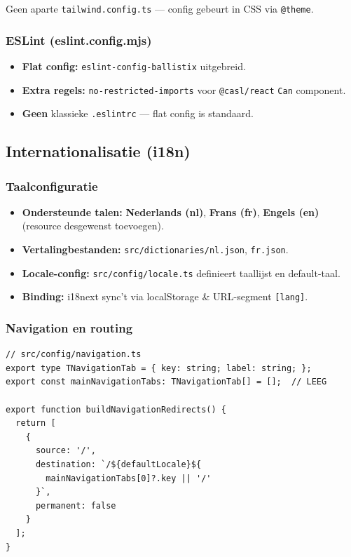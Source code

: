 \noindent
Geen aparte \texttt{tailwind.config.ts} — config gebeurt in CSS via \texttt{@theme}.

\subsubsection{ESLint (eslint.config.mjs)}

\begin{itemize}
  \item \textbf{Flat config:} \texttt{eslint-config-ballistix} uitgebreid.
  \item \textbf{Extra regels:} \texttt{no-restricted-imports} voor \texttt{@casl/react} \texttt{Can} component.
  \item \textbf{Geen} klassieke \texttt{.eslintrc} — flat config is standaard.
\end{itemize}

\subsection{Internationalisatie (i18n)}

\subsubsection{Taalconfiguratie}

\begin{itemize}
  \item \textbf{Ondersteunde talen:} \textbf{Nederlands (nl)}, \textbf{Frans (fr)}, \textbf{Engels (en)} (resource desgewenst toevoegen).
  \item \textbf{Vertalingbestanden:} \texttt{src/dictionaries/nl.json}, \texttt{fr.json}.
  \item \textbf{Locale-config:} \texttt{src/config/locale.ts} definieert taallijst en default-taal.
  \item \textbf{Binding:} i18next sync't via localStorage \& URL-segment \texttt{[lang]}.
\end{itemize}

\subsubsection{Navigation en routing}

\begin{verbatim}
// src/config/navigation.ts
export type TNavigationTab = { key: string; label: string; };
export const mainNavigationTabs: TNavigationTab[] = [];  // LEEG

export function buildNavigationRedirects() {
  return [
    {
      source: '/',
      destination: `/${defaultLocale}${
        mainNavigationTabs[0]?.key || '/'
      }`,
      permanent: false
    }
  ];
}
\end{verbatim}


